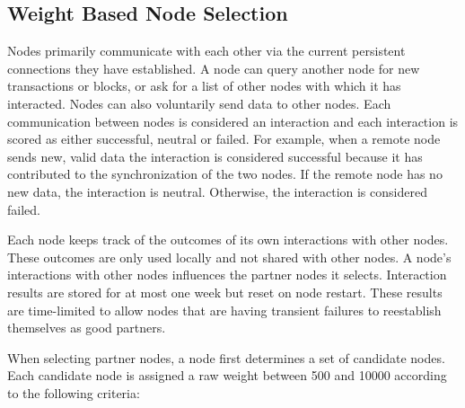 \subsection{Weight Based Node Selection}
\label{sec:reputation:NodeSelection}

Nodes primarily communicate with each other via the current persistent connections they have established.
A node can query another node for new transactions or blocks, or ask for a list of other nodes with which it has interacted.
Nodes can also voluntarily send data to other nodes.
Each communication between nodes is considered an interaction and each interaction is scored as either successful, neutral or failed.
For example, when a remote node sends new, valid data the interaction is considered successful because it has contributed to the synchronization of the two nodes.
If the remote node has no new data, the interaction is neutral.
Otherwise, the interaction is considered failed.

Each node keeps track of the outcomes of its own interactions with other nodes.
These outcomes are only used locally and not shared with other nodes.
A node's interactions with other nodes influences the partner nodes it selects.
Interaction results are stored for at most one week but reset on node restart.
These results are time-limited to allow nodes that are having transient failures to reestablish themselves as good partners.

When selecting partner nodes, a node first determines a set of candidate nodes.
Each candidate node is assigned a raw weight between 500 and 10000 according to the following criteria:

